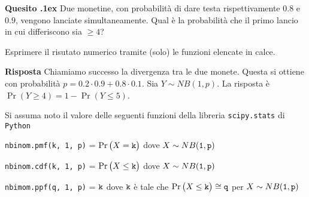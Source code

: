 \documentclass[11pt,twoside,a4paper]{article}
\newcounter{quesito}
\newenvironment{question}{\addtocounter{quesito}{1}\par\textbf{Quesito \thequesito.\kern1ex}}{\vspace{0.5\parskip}}
\newenvironment{answer}{\par\textbf{Risposta\quad}}{\vspace{\parskip}}
\begin{document}
\begin{question}
Due monetine, con probabilità di dare testa rispettivamente $0.8$ e $0.9$, vengono lanciate simultaneamente. Qual è la probabilità che il primo lancio in cui differiscono sia $\ge 4$? 

Esprimere il risutato numerico tramite (solo) le funzioni elencate in calce.
\begin{answer}
Chiamiamo successo la divergenza tra le due monete. Questa si ottiene con probabilità $p=0.2\cdot0.9+0.8\cdot0.1$. Sia $Y\sim NB(1,p)$. La risposta è $\Pr(Y\ge 4)=1-\Pr(Y\le 5)$.
\end{answer}
\end{question}

\vfill
\hrulefill

Si assuma noto il valore delle seguenti funzioni della libreria {\tt scipy.stats\/} di  {\tt Python\/}

{\tt nbinom.pmf(k, 1, p)} = $\Pr\big(X={\tt k}\big)$ dove $X\sim NB({\tt 1},{\tt p})$ 

{\tt nbinom.cdf(k, 1, p)} = $\Pr\big(X\le{\tt k}\big)$ dove  $X\sim NB({\tt 1},{\tt p})$ 

{\tt nbimom.ppf(q, 1, p)} = ${\tt k}$ dove ${\tt k}$ è tale che $\Pr\big(X\le{\tt k}\big)\cong{\tt q}$ per $X\sim NB({\tt 1},{\tt p})$ 
\end{document}
